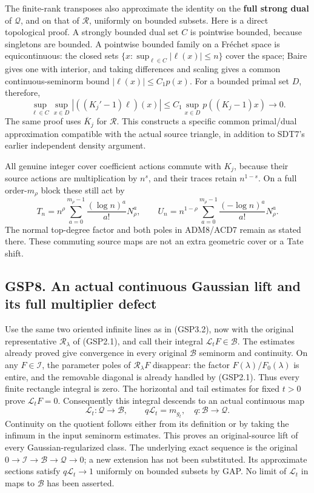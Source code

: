 The finite-rank transposes also approximate the identity on the
\textbf{full strong dual} of \(\mathcal Q\), and on that of
\(\mathcal R\), uniformly on bounded subsets. Here is a direct
topological proof. A strongly bounded dual set \(C\) is pointwise
bounded, because singletons are bounded. A pointwise bounded family on a
Fréchet space is equicontinuous: the closed sets
\(\{x:\sup_{\ell\in C}|\ell(x)|\le n\}\) cover the space; Baire gives
one with interior, and taking differences and scaling gives a common
continuous-seminorm bound \(|\ell(x)|\le C_1p(x)\). For a bounded primal
set \(D\), therefore, \[
\sup_{\ell\in C}\sup_{x\in D}
|((K_j'-1)\ell)(x)|
\le C_1\sup_{x\in D}p((K_j-1)x)\longrightarrow0.
\tag{GSP7.3}
\] The same proof uses \(\overline K_j\) for \(\mathcal R\). This
constructs a specific common primal/dual approximation compatible with
the actual source triangle, in addition to SDT7's earlier independent
density argument.

All genuine integer cover coefficient actions commute with \(K_j\),
because their source actions are multiplication by \(n^s\), and their
traces retain \(n^{1-s}\). On a full order-\(m_\rho\) block these still
act by \[
T_n=n^\rho\sum_{a=0}^{m_\rho-1}\frac{(\log n)^a}{a!}N_\rho^a,
\qquad U_n=n^{1-\rho}\sum_{a=0}^{m_\rho-1}\frac{(-\log n)^a}{a!}N_\rho^a.
\tag{GSP7.4}
\] The normal top-degree factor and both poles in ADM8/ACD7 remain as
stated there. These commuting source maps are not an extra geometric
cover or a Tate shift.

\subsection{GSP8. An actual continuous Gaussian lift and its full
multiplier
defect}\label{gsp8.-an-actual-continuous-gaussian-lift-and-its-full-multiplier-defect}

Use the same two oriented infinite lines as in (GSP3.2), now with the
original representative \(\mathscr R_\lambda\) of (GSP2.1), and call
their integral \(\mathscr L_tF\in\mathcal B\). The estimates already
proved give convergence in every original \(\mathcal B\) seminorm and
continuity. On any \(F\in\mathcal I\), the parameter poles of
\(\mathscr R_\lambda F\) disappear: the factor
\(F(\lambda)/F_0(\lambda)\) is entire, and the removable diagonal is
already handled by (GSP2.1). Thus every finite rectangle integral is
zero. The horizontal and tail estimates for fixed \(t>0\) prove
\(\mathscr L_tF=0\). Consequently this integral descends to an actual
continuous map \[
\mathcal L_t:\mathcal Q\longrightarrow\mathcal B,\qquad
q\mathcal L_t=m_{g_t},\quad q:\mathcal B\to\mathcal Q.
\tag{GSP8.1}
\] Continuity on the quotient follows either from its definition or by
taking the infimum in the input seminorm estimates. This proves an
original-source lift of every Gaussian-regularized class. The underlying
exact sequence is the original
\(0\to\mathcal I\to\mathcal B\to\mathcal Q\to0\); a new extension has
not been substituted. Its approximate sections satisfy
\(q\mathcal L_t\to1\) uniformly on bounded subsets by GAP. No limit of
\(\mathcal L_t\) in maps to \(\mathcal B\) has been asserted.

